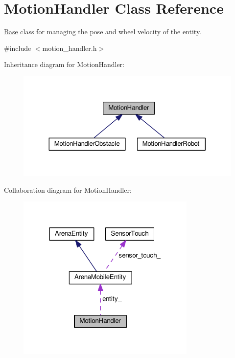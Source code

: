 \hypertarget{classMotionHandler}{}\section{Motion\+Handler Class Reference}
\label{classMotionHandler}


\hyperlink{classBase}{Base} class for managing the pose and wheel velocity of the entity.  




{\ttfamily \#include $<$motion\+\_\+handler.\+h$>$}



Inheritance diagram for Motion\+Handler\+:\nopagebreak
\begin{figure}[H]
\begin{center}
\leavevmode
\includegraphics[width=324pt]{classMotionHandler__inherit__graph}
\end{center}
\end{figure}


Collaboration diagram for Motion\+Handler\+:\nopagebreak
\begin{figure}[H]
\begin{center}
\leavevmode
\includegraphics[width=250pt]{classMotionHandler__coll__graph}
\end{center}
\end{figure}
